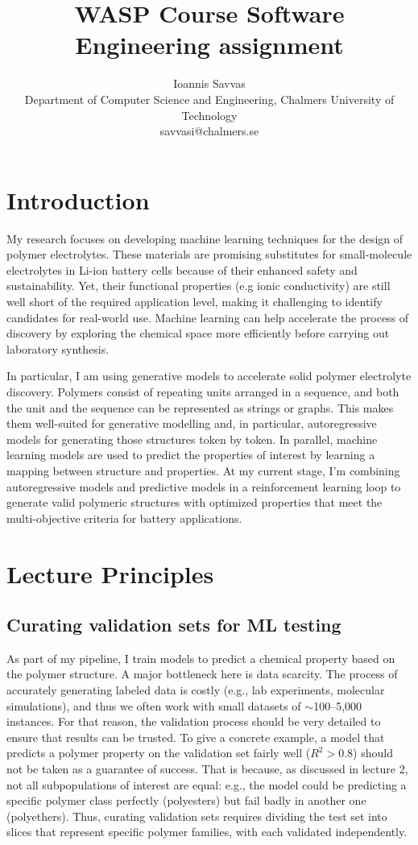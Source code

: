 \documentclass[11pt,a4paper]{article}
\title{\textbf{WASP Course Software Engineering assignment}}
\author{Ioannis Savvas\\
\small Department of Computer Science and Engineering, Chalmers University of Technology\\
\small savvasi@chalmers.se}
\begin{document}
\maketitle

\section{Introduction}

My research focuses on developing machine learning techniques for the design of polymer electrolytes. These materials are promising substitutes for small-molecule electrolytes in Li-ion battery cells because of their enhanced safety and sustainability. Yet, their functional properties (e.g ionic conductivity) are still well short of the required application level, making it challenging to identify candidates for real-world use. Machine learning can help accelerate the process of discovery by exploring the chemical space more efficiently before carrying out laboratory synthesis. 

In particular, I am using generative models to accelerate solid polymer electrolyte discovery. Polymers consist of repeating units arranged in a sequence, and both the unit and the sequence can be represented as strings or graphs. This makes them well-suited for generative modelling and, in particular, autoregressive models for generating those structures token by token. In parallel, machine learning models are used to predict the properties of interest by learning a mapping between structure and properties. At my current stage, I'm combining autoregressive models and predictive models in a reinforcement learning loop to generate valid polymeric structures with optimized properties that meet the multi-objective criteria for battery applications.

\section{Lecture Principles}

\subsection{Curating validation sets for ML testing}
As part of my pipeline, I train models to predict a chemical property based on the polymer structure. A major bottleneck here is data scarcity. The process of accurately generating labeled data is costly (e.g., lab experiments, molecular simulations), and thus we often work with small datasets of $\sim$100--5,000 instances. For that reason, the validation process should be very detailed to ensure that results can be trusted. To give a concrete example, a model that predicts a polymer property on the validation set fairly well ($R^2 > 0.8$) should not be taken as a guarantee of success. That is because, as discussed in lecture 2, not all subpopulations of interest are equal: e.g., the model could be predicting a specific polymer class perfectly (polyesters) but fail badly in another one (polyethers). Thus, curating validation sets requires dividing the test set into slices that represent specific polymer families, with each validated independently.
\end{document}
